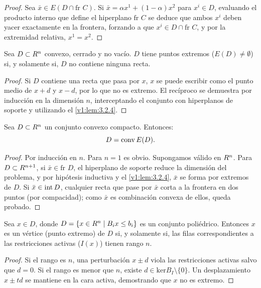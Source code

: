 \begin{proof}
 Sea $\bar{x} \in E(D \cap \text{fr } C)$. Si $\bar{x} = \alpha x^1 + (1 - \alpha)x^2$ para $x^i \in D$, evaluando el producto interno que define el hiperplano $\text{fr } C$ se deduce que ambos $x^i$ deben yacer exactamente en la frontera, forzando a que $x^i \in D \cap \text{fr } C$, y por la extremidad relativa, $x^1 = x^2$.
\end{proof}

\begin{proposition}\label{v1:prop:3.2.10}
 Sea $D \subset R^n$ convexo, cerrado y no vacío. $D$ tiene puntos extremos ($E(D) \neq \emptyset$) si, y solamente si, $D$ no contiene ninguna recta.
\end{proposition}

\begin{proof}
 Si $D$ contiene una recta que pasa por $x$, $x$ se puede escribir como el punto medio de $x+d$ y $x-d$, por lo que no es extremo. El recíproco se demuestra por inducción en la dimensión $n$, interceptando el conjunto con hiperplanos de soporte y utilizando el \cref{v1:lem:3.2.4}.
\end{proof}

\begin{theorem}\label{v1:thm:3.2.7}
 Sea $D \subset R^n$ un conjunto convexo compacto. Entonces:
 \[
 D = \operatorname{conv} E(D).
 \]
\end{theorem}

\begin{proof}
 Por inducción en $n$. Para $n=1$ es obvio. Supongamos válido en $R^n$. Para $D \subset R^{n+1}$, si $\bar{x} \in \text{fr } D$, el hiperplano de soporte reduce la dimensión del problema, y por hipótesis inductiva y el \cref{v1:lem:3.2.4}, $\bar{x}$ se forma por extremos de $D$. Si $\bar{x} \in \operatorname{\operatorname{int}} D$, cualquier recta que pase por $\bar{x}$ corta a la frontera en dos puntos (por compacidad); como $\bar{x}$ es combinación convexa de ellos, queda probado.
\end{proof}

\begin{proposition}\label{v1:prop:3.2.11}
 Sea $x \in D$, donde $D = \{ x \in R^n \mid B_i x \leq b_i \}$ es un conjunto poliédrico. Entonces $x$ es un vértice (punto extremo) de $D$ si, y solamente si, las filas correspondientes a las restricciones activas ($I(x)$) tienen rango $n$.
\end{proposition}

\begin{proof}
 Si el rango es $n$, una perturbación $x \pm d$ viola las restricciones activas salvo que $d=0$. Si el rango es menor que $n$, existe $d \in \text{ker} B_I \setminus \{0\}$. Un desplazamiento $x \pm td$ se mantiene en la cara activa, demostrando que $x$ no es extremo.
\end{proof}

